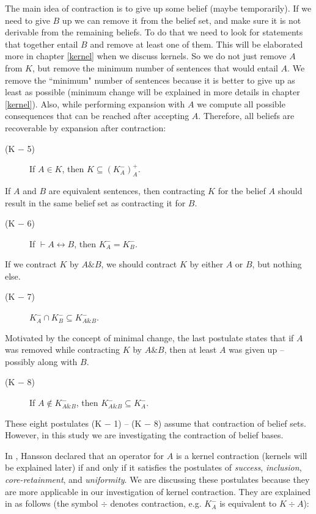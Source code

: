 The main idea of contraction is to give up some belief (maybe temporarily). If we need to give $B$ up we can remove it from the belief set, and make sure it is not derivable from the remaining beliefs. To do that we need to look for statements that together entail $B$ and remove at least one of them. This will be elaborated more in chapter \ref{kernel} when we discuss kernels. So we do not just remove $A$ from $K$, but remove the minimum number of sentences that would entail $A$. We remove the ``minimum" number of sentences because it is better to give up as least as possible (minimum change will be explained in more details in chapter \ref{kernel}). Also, while performing expansion with $A$ we compute all possible consequences that can be reached after accepting $A$. Therefore, all beliefs are recoverable by expansion after contraction:
\begin{description}
\item[(K $-$ 5)] If $A \in K$, then $K \subseteq (K^{-}_{A})^{+}_{A}$.
\end{description}
If $A$ and $B$ are equivalent sentences, then contracting $K$ for the belief $A$ should result in the same belief set as contracting it for $B$.
\begin{description}
\item[(K $-$ 6)] If $\vdash A \leftrightarrow B$, then $K^{-}_{A} = K^{-}_{B}$.
\end{description}
If we contract $K$ by $A \& B$, we should contract $K$ by either $A$ or $B$, but nothing else.
\begin{description}
\item[(K $-$ 7)] $K^{-}_{A} \cap K^{-}_{B} \subseteq K^{-}_{A \& B}$.
\end{description}
Motivated by the concept of minimal change, the last postulate states that if $A$ was removed while contracting $K$ by $A \& B$, then at least $A$ was given up -- possibly along with $B$.
\begin{description}
\item[(K $-$ 8)] If $A \notin K^{-}_{A \& B}$, then $K^{-}_{A \& B} \subseteq K^{-}_{A}$.
\end{description}

These eight postulates (K $-$ 1) -- (K $-$ 8) assume that contraction of belief sets. However, in this study we are investigating the contraction of belief bases. 

In \cite{hansson}, Hansson declared that an operator for $A$ is a kernel contraction (kernels will be explained later) if and only if it satisfies the postulates of \textit{success}, \textit{inclusion}, \textit{core-retainment}, and \textit{uniformity}. We are discussing these postulates because they are more applicable in our investigation of kernel contraction. They are explained in \cite{hansson} as follows (the symbol $\div$ denotes contraction, e.g. $K^{-}_{A}$ is equivalent to $K \div A$):

